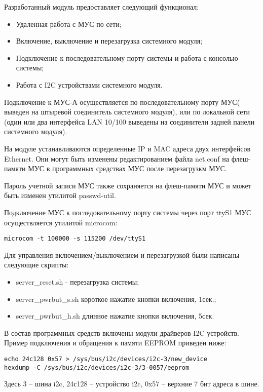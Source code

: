Разработанный модуль предоставляет следующий функционал:
\begin{itemize}
	\item Удаленная работа с МУС по сети;
	\item Включение, выключение и перезагрузка системного модуля;
	\item Подключение к последовательному порту системы и работа с консолью системы;
	\item Работа с I2C устройствами системного модуля.
\end{itemize}

Подключение к МУС-А осуществляется по последовательному порту МУС( выведен на штыревой соединитель системного модуля), или по локальной сети (один или два интерфейса LAN 10/100 выведены на соединители задней панели системного модуля).

На модуле устанавливаются определенные IP и MAC адреса двух интерфейсов Ethernet. Они могут быть изменены редактированием файла net.conf на флеш-памяти МУС в программных средствах МУС после перезагрузкм МУС.


Пароль учетной записи МУС также сохраняется на флеш-памяти МУС и может быть изменен утилитой passwd-util.

Подключение МУС к последовательному порту системы через порт ttyS1 МУС осуществляется утилитой microcom:
\begin{lstlisting}
microcom -t 100000 -s 115200 /dev/ttyS1
\end{lstlisting}

Для управления включением/выключением и перезагрузкой были написаны следующие скрипты:

\begin{itemize}
	\item server\_reset.sh - перезагрузка системы;
	\item server\_pwrbut\_s.sh короткое нажатие кнопки включения, 1сек.;
	\item server\_pwrbut\_h.sh длинное нажатие кнопки включения, 5сек.
\end{itemize}

В состав программных средств включены модули драйверов I2C устройств. Пример подключения и обращения к памяти EEPROM приведен ниже:
\begin{lstlisting}
echo 24c128 0x57 > /sys/bus/i2c/devices/i2c-3/new_device
hexdump -С /sys/bus/i2c/devices/i2c-3/3-0057/eeprom
\end{lstlisting}
Здесь 3 – шина i2c, 24с128 – устройство i2c, 0x57 – верхние 7 бит адреса в шине. 

